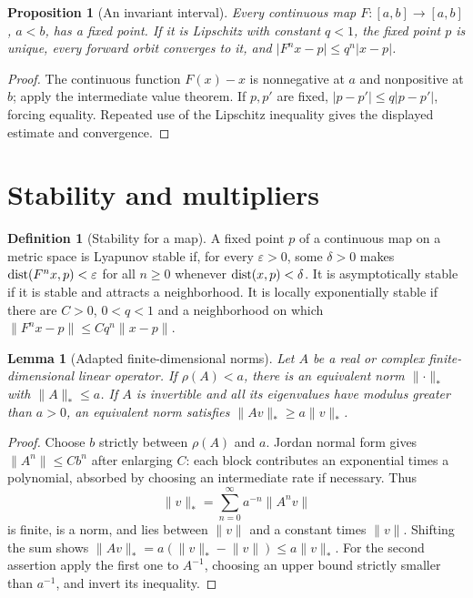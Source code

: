 \documentclass[11pt,oneside]{book}
\newtheorem{lemma}[theorem]{Lemma}
\newtheorem{proposition}[theorem]{Proposition}
\theoremstyle{definition}
\newtheorem{definition}[theorem]{Definition}
\theoremstyle{remark}\newtheorem{remark}[theorem]{Remark}
\newcommand{\abs}[1]{\lvert#1\rvert}\newcommand{\norm}[1]{\lVert#1\rVert}
\begin{document}
\begin{proposition}[An invariant interval]\label{d13:15:interval-fixed-point}
Every continuous map \(F:[a,b]\to[a,b]\), \(a<b\), has a fixed point.
If it is Lipschitz with constant \(q<1\), the fixed point \(p\) is unique,
every forward orbit converges to it, and
\(\abs{F^nx-p}\leq q^n\abs{x-p}\).
\end{proposition}
\begin{proof}
The continuous function \(F(x)-x\) is nonnegative at \(a\) and nonpositive
at \(b\); apply the intermediate value theorem. If \(p,p'\) are fixed,
\(\abs{p-p'}\leq q\abs{p-p'}\), forcing equality. Repeated use of the
Lipschitz inequality gives the displayed estimate and convergence.
\end{proof}

\section{Stability and multipliers}

\begin{definition}[Stability for a map]\label{d13:15:stability-definition}
A fixed point \(p\) of a continuous map on a metric space is Lyapunov stable
if, for every \(\varepsilon>0\), some \(\delta>0\) makes
\(\operatorname{dist}(F^nx,p)<\varepsilon\) for all \(n\geq0\) whenever
\(\operatorname{dist}(x,p)<\delta\). It is asymptotically stable if it is stable and attracts
a neighborhood. It is locally exponentially stable if there are \(C>0\),
\(0<q<1\) and a neighborhood on which
\(\norm{F^nx-p}\leq Cq^n\norm{x-p}\).
\end{definition}

\begin{lemma}[Adapted finite-dimensional norms]\label{d13:15:adapted-norm}
Let \(A\) be a real or complex finite-dimensional linear operator. If
\(\rho(A)<a\), there is an equivalent norm \(\norm{\cdot}_*\) with
\(\norm{A}_*\leq a\). If \(A\) is invertible and all its eigenvalues have
modulus greater than \(a>0\), an equivalent norm satisfies
\(\norm{Av}_*\geq a\norm{v}_*\).
\end{lemma}
\begin{proof}
Choose \(b\) strictly between \(\rho(A)\) and \(a\). Jordan normal form
gives \(\norm{A^n}\leq Cb^n\) after enlarging \(C\): each block contributes
an exponential times a polynomial, absorbed by choosing an intermediate
rate if necessary. Thus
\[
 \norm{v}_*=\sum_{n=0}^\infty a^{-n}\norm{A^nv}
\]
is finite, is a norm, and lies between \(\norm{v}\) and a constant times
\(\norm{v}\). Shifting the sum shows
\(\norm{Av}_*=a(\norm{v}_*-\norm{v})\leq a\norm{v}_*\).
For the second assertion apply the first one to \(A^{-1}\), choosing
an upper bound strictly smaller than \(a^{-1}\), and invert its inequality.
\end{proof}
\end{document}
